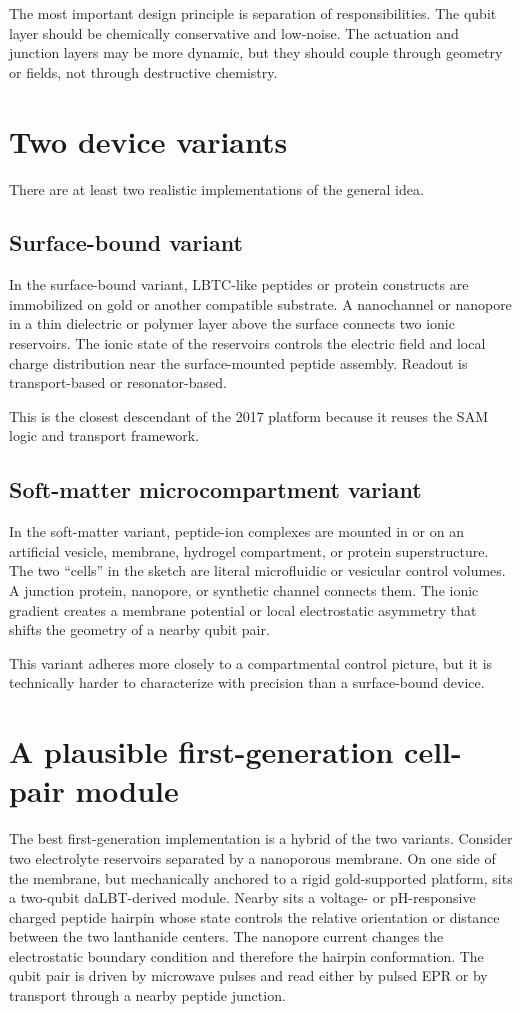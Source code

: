 \documentclass[11pt]{report}
\newcommand{\lbtc}{LBTC}
\newcommand{\dalbt}{daLBT}
\theoremstyle{definition}
\begin{document}
The most important design principle is separation of responsibilities. The qubit layer should be chemically conservative and low-noise. The actuation and junction layers may be more dynamic, but they should couple through geometry or fields, not through destructive chemistry.

\section{Two device variants}
There are at least two realistic implementations of the general idea.

\subsection{Surface-bound variant}
In the surface-bound variant, \lbtc{}-like peptides or protein constructs are immobilized on gold or another compatible substrate. A nanochannel or nanopore in a thin dielectric or polymer layer above the surface connects two ionic reservoirs. The ionic state of the reservoirs controls the electric field and local charge distribution near the surface-mounted peptide assembly. Readout is transport-based or resonator-based.

This is the closest descendant of the 2017 platform because it reuses the SAM logic and transport framework.

\subsection{Soft-matter microcompartment variant}
In the soft-matter variant, peptide-ion complexes are mounted in or on an artificial vesicle, membrane, hydrogel compartment, or protein superstructure. The two ``cells'' in the sketch are literal microfluidic or vesicular control volumes. A junction protein, nanopore, or synthetic channel connects them. The ionic gradient creates a membrane potential or local electrostatic asymmetry that shifts the geometry of a nearby qubit pair.

This variant adheres more closely to a compartmental control picture, but it is technically harder to characterize with precision than a surface-bound device.

\section{A plausible first-generation cell-pair module}
The best first-generation implementation is a hybrid of the two variants. Consider two electrolyte reservoirs separated by a nanoporous membrane. On one side of the membrane, but mechanically anchored to a rigid gold-supported platform, sits a two-qubit \dalbt{}-derived module. Nearby sits a voltage- or pH-responsive charged peptide hairpin whose state controls the relative orientation or distance between the two lanthanide centers. The nanopore current changes the electrostatic boundary condition and therefore the hairpin conformation. The qubit pair is driven by microwave pulses and read either by pulsed EPR or by transport through a nearby peptide junction.
\end{document}
